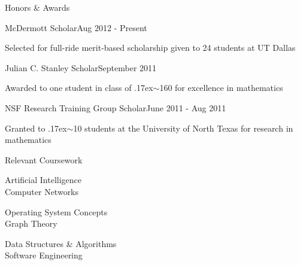 \documentclass{resume} %
\begin{document}
\begin{rSection}{Honors \& Awards}

\begin{honors_section}{McDermott Scholar}{Aug 2012 - Present}
\item Selected for full-ride merit-based scholarship given to 24 students at UT Dallas
\end{honors_section}

\begin{honors_section}{Julian C. Stanley Scholar}{September 2011}
\item Awarded to one student in class of {\raise.17ex\hbox{$\scriptstyle\sim$}}160 for excellence in mathematics
\end{honors_section}

\begin{honors_section}{NSF Research Training Group Scholar}{June 2011 - Aug 2011}
\item Granted to {\raise.17ex\hbox{$\scriptstyle\sim$}}10 students at the University of North Texas for research in mathematics
\end{honors_section}



\end{rSection}

\begin{rSection2}{Relevant Coursework}

\begin{minipage}{0.33\textwidth}
\centering
Artificial Intelligence\\
Computer Networks
\end{minipage}%
\begin{minipage}{0.33\textwidth}
\centering
Operating System Concepts\\
Graph Theory
\end{minipage}%
\begin{minipage}{0.33\textwidth}
\centering
Data Structures \& Algorithms\\
Software Engineering
\end{minipage}

\end{rSection2}
\end{document}
